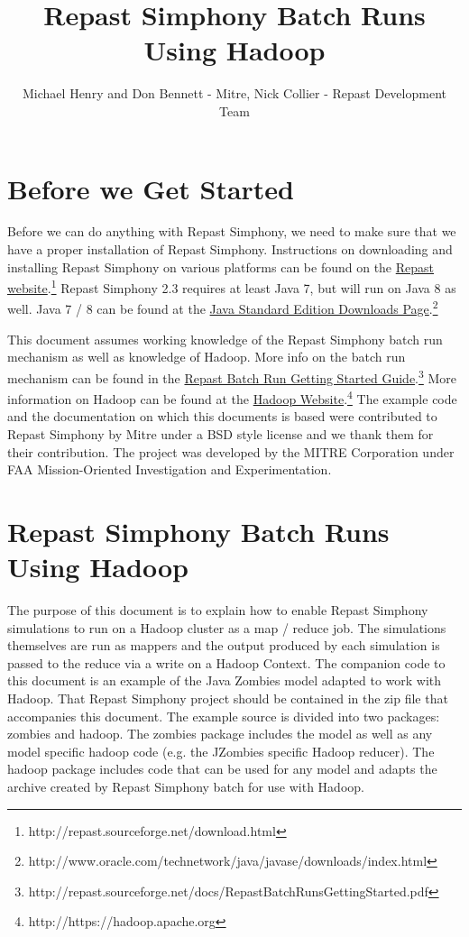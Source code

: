 \documentclass[11pt]{amsart}
\title{Repast Simphony Batch Runs Using Hadoop}
\author{Michael Henry and Don Bennett - Mitre, Nick Collier - Repast Development Team}
\begin{document}
 
\maketitle
\setcounter{section}{-1}

\section{Before we Get Started}
Before we can do anything with Repast Simphony, we need to make sure that we have a proper installation of Repast Simphony. Instructions on downloading and installing Repast Simphony on various platforms can be found on the \href{http://repast.sourceforge.net/download.html}{Repast website}.\footnote{http://repast.sourceforge.net/download.html} Repast Simphony 2.3 requires at least Java 7, but will run on Java 8 as well. Java 7 / 8  can be found at the \href{http://www.oracle.com/technetwork/java/javase/downloads/index.html}{Java Standard Edition Downloads Page}.\footnote{http://www.oracle.com/technetwork/java/javase/downloads/index.html} 

This document assumes working knowledge of the Repast Simphony batch run mechanism as well as knowledge of Hadoop. More info on the batch run mechanism can be found in the \href{http://repast.sourceforge.net/docs/RepastBatchRunsGettingStarted.pdf}{Repast Batch Run Getting Started Guide}.\footnote{http://repast.sourceforge.net/docs/RepastBatchRunsGettingStarted.pdf} More information on Hadoop can be found at the \href{https://hadoop.apache.org}{Hadoop Website}.\footnote{http://https://hadoop.apache.org} The example code and the documentation on which this documents is based were contributed to Repast Simphony by Mitre under a BSD style license and we thank them for their contribution. The project was developed by the MITRE Corporation under FAA Mission-Oriented Investigation and Experimentation.

\section{Repast Simphony Batch Runs Using Hadoop}
The purpose of this document is to explain how to enable Repast Simphony simulations to run on a Hadoop cluster as a map / reduce job. The simulations themselves are run as mappers and the output produced by each simulation is passed to the reduce via a write on a Hadoop Context. The companion code to this document is an example of the Java Zombies model adapted to work with Hadoop. That Repast Simphony project should be contained in the zip file that accompanies this document. The example source is divided into two packages: zombies and hadoop. The zombies package includes the model as well as any model specific hadoop code (e.g. the JZombies specific Hadoop reducer). The hadoop package includes code that can be used for any model and adapts the archive created by Repast Simphony batch for use with Hadoop.
\end{document}
